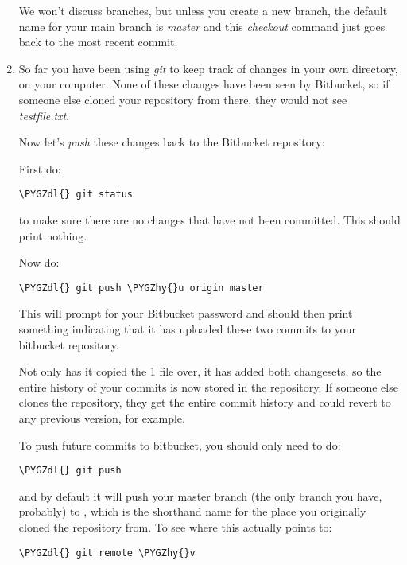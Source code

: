 \documentclass[letterpaper,10pt,english]{sphinxmanual}
\def\PYGZdl{\char`\$}
\def\PYGZhy{\char`\-}
\begin{document}
\begin{enumerate}
We won't discuss branches, but unless you create a new branch, the
default name for your main branch is \emph{master} and this \emph{checkout} command
just goes back to the most recent commit.

\item {} 
So far you have been using \emph{git} to keep track of changes in your own
directory, on your computer.  None of these changes have been seen by
Bitbucket, so if someone else cloned your repository from there, they
would not see \emph{testfile.txt}.

Now let's \emph{push} these changes back to the Bitbucket repository:

First do:

\begin{Verbatim}[commandchars=\\\{\}]
\PYGZdl{} git status
\end{Verbatim}

to make sure there are no changes that have not been committed.  This
should print nothing.

Now do:

\begin{Verbatim}[commandchars=\\\{\}]
\PYGZdl{} git push \PYGZhy{}u origin master
\end{Verbatim}

This will prompt for your Bitbucket password and should then print
something indicating that it has uploaded these two commits to
your bitbucket repository.

Not only has it copied the 1 file over, it has added both changesets, so
the entire history of your commits is now stored in the repository.  If
someone else clones the repository, they get the entire commit history
and could revert to any previous version, for example.

To push future commits to bitbucket, you should only need to do:

\begin{Verbatim}[commandchars=\\\{\}]
\PYGZdl{} git push
\end{Verbatim}

and by default it will push your master branch (the only branch you
have, probably) to , which is the shorthand name for the
place you originally cloned the repository from.  To see where this
actually points to:

\begin{Verbatim}[commandchars=\\\{\}]
\PYGZdl{} git remote \PYGZhy{}v
\end{Verbatim}


\end{enumerate}
\end{document}
